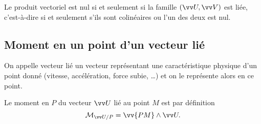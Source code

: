 Le produit vectoriel est nul si et seulement si la famille \((\vU,\vV)\) est 
liée, c'est-à-dire si et seulement s'ils sont colinéaires ou l'un des deux est 
nul.

\subsection{Moment en un point d'un vecteur lié}%
\label{chap1-sec:momentenunpointdunvecteurlié}%

On appelle vecteur lié un vecteur représentant une caractéristique physique 
d'un point donné (vitesse, accélération, force subie, \ldots) et on le 
représente alors en ce point.

Le moment en \(P\) du vecteur \(\vU\) lié au point \(M\) est par définition
\begin{equation}%
  \Mom{P}{\vU}=\vv{PM}\wedge\vU.%
\end{equation}%

